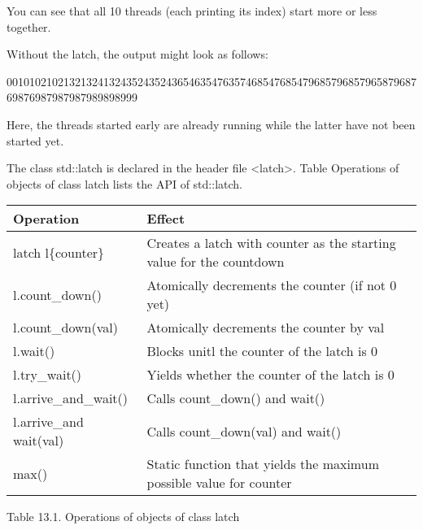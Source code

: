 You can see that all 10 threads (each printing its index) start more or less together.

Without the latch, the output might look as follows:

\begin{shell}
00101021021321324132435243524365463547635746854768547968579685796587968769876987987987989898999
\end{shell}

Here, the threads started early are already running while the latter have not been started yet.


The class std::latch is declared in the header file <latch>. Table Operations of objects of class latch lists the API of std::latch.

\begin{longtable}[c]{|l|l|}
\hline
\textbf{Operation}      & \textbf{Effect}                              \\ \hline
\endfirsthead
%
\endhead
%
latch l\{counter\} & Creates a latch with counter as the starting value for the countdown \\ \hline
l.count\_down()    & Atomically decrements the counter (if not 0 yet)                     \\ \hline
l.count\_down(val)      & Atomically decrements the counter by val     \\ \hline
l.wait()                & Blocks unitl the counter of the latch is 0   \\ \hline
l.try\_wait()           & Yields whether the counter of the latch is 0 \\ \hline
l.arrive\_and\_wait()   & Calls count\_down() and wait()               \\ \hline
l.arrive\_and wait(val) & Calls count\_down(val) and wait()            \\ \hline
max()              & Static function that yields the maximum possible value for counter   \\ \hline
\end{longtable}

\begin{center}
Table 13.1. Operations of objects of class latch
\end{center}

